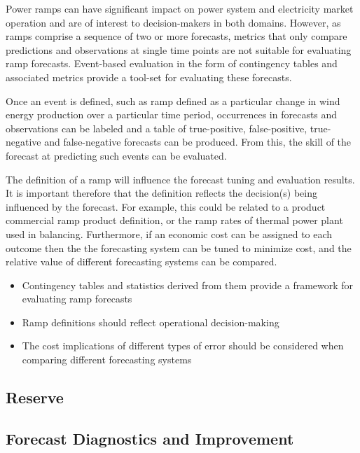 
Power ramps can have significant impact on power system and electricity market operation and are of interest to decision-makers in both domains. However, as ramps comprise a sequence of two or more forecasts, metrics that only compare predictions and observations at single time points are not suitable for evaluating ramp forecasts. Event-based evaluation in the form of contingency tables and associated metrics provide a tool-set for evaluating these forecasts.

Once an event is defined, such as ramp defined as a particular change in wind energy production over a particular time period, occurrences in forecasts and observations can be labeled and a table of true-positive, false-positive, true-negative and false-negative forecasts can be produced. From this, the skill of the forecast at predicting such events can be evaluated. 

The definition of a ramp will influence the forecast tuning and evaluation results. It is important therefore that the definition reflects the decision(s) being influenced by the forecast. For example, this could be related to a product commercial ramp product definition, or the ramp rates of thermal power plant used in balancing. Furthermore, if an economic cost can be assigned to each outcome then the the forecasting system can be tuned to minimize cost, and the relative value of different forecasting systems can be compared. %

\begin{itemize}
    \item Contingency tables and statistics derived from them provide a framework for evaluating ramp forecasts
    \item Ramp definitions should reflect operational decision-making
    \item The cost implications of different types of error should be considered when comparing different forecasting systems
\end{itemize}


\subsection{Reserve}

\subsection{Forecast Diagnostics and Improvement}

